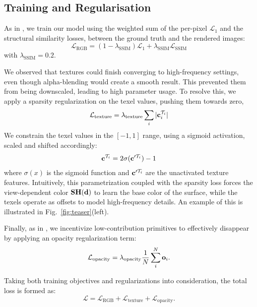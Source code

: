 \begin{table}[!ht]
\caption{\label{tab:same-param-eval}
We compare against BBSplat and GSTex in a same parameter setting,
by adjusting their primitive count and texels accordingly.
The slight discrepancy in BBSplat's parameters in Tanks \& Temples is due to a sphere sampling method they use to model the background and distant objects.
}
\end{table}


\subsection{Training and Regularisation}
As in \cite{3dgs},
we train our model using the weighted sum of the per-pixel $\mathcal{L}_1$
and the structural similarity losses,
between the ground truth and the rendered images:
\begin{equation}
    \mathcal{L}_{\text{RGB}} = (1-\lambda_{\text{SSIM}})\mathcal{L}_1 + \lambda_{\text{SSIM}}\mathcal{L}_{\text{SSIM}}
\end{equation}
with $\lambda_{\text{SSIM}}=0.2$.

We observed that textures could finish converging to high-frequency settings,
even though alpha-blending would create a smooth result.
This prevented them from being downscaled,
leading to high parameter usage.
To resolve this,
we apply a sparsity regularization on the texel values,
pushing them towards zero,
\begin{equation}
    \mathcal{L}_{\text{texture}} = \lambda_{\text{texture}} \sum_i |\mathbf{c}_i^{\mathcal{T}_i}|
\end{equation}
We constrain the texel values in the $[-1,1]$ range,
using a sigmoid activation,
scaled and shifted accordingly:
\begin{equation}
    \mathbf{c}^{\mathcal{T}_i} = 2\sigma(\mathbf{c}'^{\mathcal{T}_i})-1
\end{equation}
where $\sigma(x)$ is the sigmoid function and $\mathbf{c}'^{\mathcal{T}_i}$ are the unactivated texture features.
Intuitively,
this parametrization coupled with the sparsity loss
forces the view-dependent color $\mathbf{SH}(\mathbf{d})$ to learn the base color of the surface,
while the texels operate as offsets to model high-frequency details.
An example of this is illustrated in Fig.~\ref{fig:teaser}(left).

Finally,
as in \cite{reduced3dgs, 3dgs-mcmc},
we incentivize low-contribution primitives to effectively disappear by applying an opacity regularization term:
\begin{equation}
    \mathcal{L}_{\text{opacity}} = \lambda_{\text{opacity}} \frac{1}{N}\sum_i^N \mathbf{o}_i.
\end{equation}

Taking both training objectives and regularizations into consideration,
the total loss is formed as:
\begin{equation}
    \mathcal{L} = \mathcal{L}_{\text{RGB}} + \mathcal{L}_{\text{texture}} + \mathcal{L}_{\text{opacity}}.
\end{equation}

